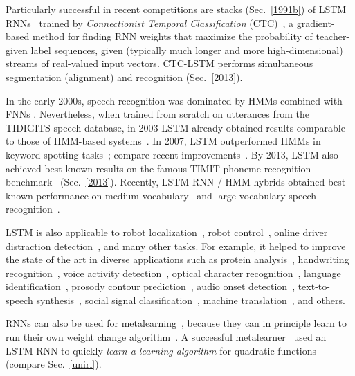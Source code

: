 \documentclass[letterpaper]{article}
\begin{document}
\begin{CJK*}{UTF8}{gbsn}
Particularly successful in recent competitions are stacks (Sec.~\ref{1991b}) of LSTM RNNs~\citep{Santi:07ijcai,graves:2009nips} trained by {\em Connectionist Temporal Classification} (CTC)~\citep{Graves:06icml},
a gradient-based method for finding RNN weights that
maximize the probability of teacher-given label sequences, 
given (typically much longer and more high-dimensional) 
streams of real-valued input vectors.
CTC-LSTM performs simultaneous segmentation (alignment) and recognition
(Sec.~\ref{2013}).


In the early 2000s,  
speech recognition was dominated by
HMMs combined with FNNs \citep[e.g.,][]{bourlard+morgan:1994}.
Nevertheless, when trained from scratch on utterances from the
TIDIGITS speech database, in 2003 
LSTM already obtained results comparable to those of 
HMM-based systems~\citep{graves+eck+beringer+schmidhuber:2003,beringer:05icann,Graves:06icml}.
In 2007, LSTM outperformed HMMs in keyword spotting tasks~\citep{DBLP:conf/icann/FernandezGS07};
compare recent improvements~\citep{indermuhle2011keyword,woellmer2013}.
By 2013, LSTM also achieved best known results  on the famous 
TIMIT phoneme recognition benchmark~\citep{graves:2013icassp} (Sec.~\ref{2013}). 
Recently, LSTM RNN / HMM hybrids obtained best known performance on medium-vocabulary~\citep{geiger2014} and
large-vocabulary speech recognition~\citep{sak2014large}.

LSTM is also applicable to
robot localization~\citep{foerster-esann07},
robot control~\citep{mayer2008}, 
online driver distraction detection~\citep{woellmer2011},
and many other tasks. For example, 
it  helped to  improve the state of the art in diverse applications such as 
protein analysis~\citep{hochreiter:snowbird},
handwriting recognition~\citep{graves:08nips,Graves:09tpami,graves:2009nips,bluche13},
voice activity detection~\citep{eyben2013},
optical character recognition~\citep{breuel2013high},
language identification~\citep{gonzalez2014},
prosody contour prediction~\citep{fernandez2014},
audio onset detection~\citep{marchi2014},
text-to-speech synthesis~\citep{fan2014},
social signal classification~\citep{brueckner2014},
machine translation~\citep{sutskever2014},
 and others.

RNNs can also be used for 
metalearning~\citep{schmidhuber87,scholarpedia2010,prokhorov2002meta},
because they can in principle learn to run their own weight change algorithm~\citep{Schmidhuber:93selfrefann}. 
A successful metalearner~\citep{Hochreiter:01meta}
used an LSTM RNN to quickly {\em learn a  learning algorithm} for quadratic functions
(compare Sec.~\ref{unirl}). 



\end{CJK*}
\end{document}

